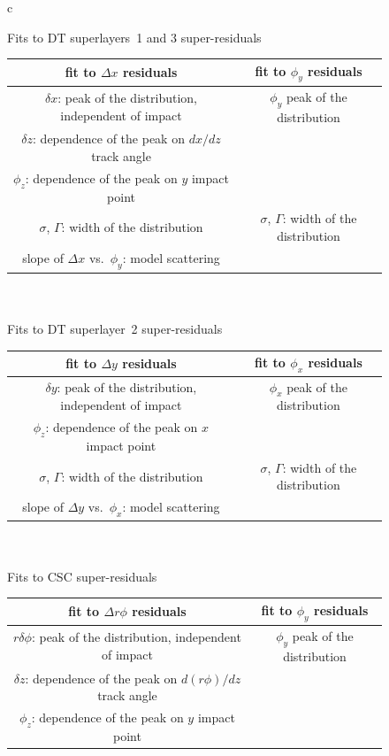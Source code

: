 \documentclass[12pt]{article}
\begin{document}
\begin{figure}
\begin{center}
\begin{tabular}{c}

Fits to DT superlayers~1 and 3 super-residuals \\
\begin{tabular}{| c | c |}
\hline fit to $\Delta x$ residuals & fit to $\phi_y$ residuals \\\hline
$\delta x$: peak of the distribution, independent of impact & $\phi_y$ peak of the distribution \\
$\delta z$: dependence of the peak on $dx/dz$ track angle & \\
$\phi_z$: dependence of the peak on $y$ impact point & \\
$\sigma$, $\Gamma$: width of the distribution & $\sigma$, $\Gamma$: width of the distribution \\
slope of $\Delta x$ vs.~$\phi_y$: model scattering & \\\hline
\end{tabular} \\
\\
Fits to DT superlayer~2 super-residuals \\
\begin{tabular}{| c | c |}
\hline fit to $\Delta y$ residuals & fit to $\phi_x$ residuals \\\hline
$\delta y$: peak of the distribution, independent of impact & $\phi_x$ peak of the distribution \\
$\phi_z$: dependence of the peak on $x$ impact point & \\
$\sigma$, $\Gamma$: width of the distribution & $\sigma$, $\Gamma$: width of the distribution \\
slope of $\Delta y$ vs.~$\phi_x$: model scattering & \\\hline
\end{tabular} \\
\\
Fits to CSC super-residuals \\
\begin{tabular}{| c | c |}
\hline fit to $\Delta r\phi$ residuals & fit to $\phi_y$ residuals \\\hline
$r\delta\phi$: peak of the distribution, independent of impact & $\phi_y$ peak of the distribution \\
$\delta z$: dependence of the peak on $d(r\phi)/dz$ track angle & \\
$\phi_z$: dependence of the peak on $y$ impact point & \\

\end{tabular}
\end{tabular}
\end{center}
\end{figure}
\end{document}
